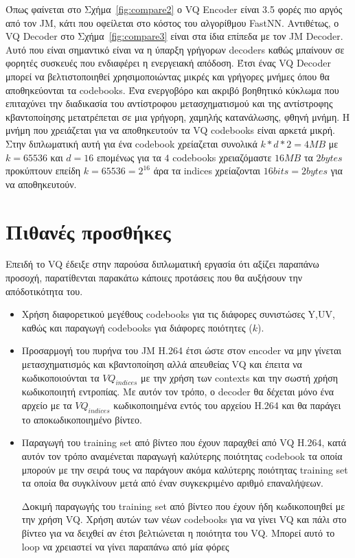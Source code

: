 \indent Όπως φαίνεται στο Σχήμα~\ref{fig:compare2}  ο VQ Encoder είναι 3.5 φορές πιο αργός από τον JM, κάτι που οφείλεται στο κόστος του αλγορίθμου FastNN. Αντιθέτως, ο VQ Decoder στο Σχήμα~\ref{fig:compare3} είναι στα ίδια επίπεδα με τον JM Decoder. Αυτό που είναι σημαντικό είναι να η ύπαρξη γρήγορων decoders καθώς μπαίνουν σε φορητές συσκευές που ενδιαφέρει η ενεργειακή απόδοση. Έτσι ένας VQ Decoder μπορεί να βελτιστοποιηθεί χρησιμοποιώντας μικρές και γρήγορες μνήμες όπου θα αποθηκεύονται τα codebooks. Ένα ενεργοβόρο και ακριβό βοηθητικό κύκλωμα που επιταχύνει την διαδικασία του αντίστροφου μετασχηματισμού και της αντίστροφης κβαντοποίησης μετατρέπεται σε μια γρήγορη, χαμηλής κατανάλωσης, φθηνή μνήμη. Η μνήμη που χρειάζεται για να αποθηκευτούν τα VQ codebooks είναι αρκετά μικρή. Στην διπλωματική αυτή για ένα codebook χρείαζεται συνολικά $k*d*2 = 4MB$ με $k=65536$ και $d=16$ επομένως για τα $4$ codebooks χρειαζόμαστε $16MB$ τα $2 bytes$ προκύπτουν επείδη $k=65536=2^{16}$ άρα τα indices χρείαζονται $16  bits = 2  bytes$ για να αποθηκευτούν.

\section{Πιθανές προσθήκες}
\label{section:sect63}

\indent Επειδή το VQ έδειξε στην παρούσα διπλωματική εργασία ότι αξίζει παραπάνω προσοχή, παρατίθενται παρακάτω κάποιες προτάσεις που θα αυξήσουν την απόδοτικότητα του.

\begin{itemize}

    \item Χρήση διαφορετικού μεγέθους codebooks για τις διάφορες συνιστώσες Y,UV, καθώς και παραγωγή codebooks για διάφορες ποιότητες ($k$).

    \item Προσαρμογή του πυρήνα του JM H.264 έτσι ώστε στον encoder να μην γίνεται μετασχηματισμός και κβαντοποίηση αλλά απευθείας VQ και έπειτα να κωδικοποιούνται τα $VQ_{indices}$ με την χρήση των contexts και την σωστή χρήση κωδικοποιητή εντροπίας. Με αυτόν τον τρόπο, ο decoder θα δέχεται μόνο ένα αρχείο με τα $VQ_{indices}$ κωδικοποιημένα εντός του αρχείου H.264 και θα παράγει το αποκωδικοποιημένο βίντεο.

    \item Παραγωγή του training set από βίντεο που έχουν παραχθεί από VQ H.264, κατά αυτόν τον τρόπο αναμένεται παραγωγή καλύτερης ποιότητας codebook τα οποία μπορούν με την σειρά τους να παράγουν ακόμα καλύτερης ποιότητας training set τα οποία θα συγκλίνουν μετά από έναν συγκεκριμένο αριθμό επαναλήψεων.
    
    Δοκιμή παραγωγής του training set από βίντεο που έχουν ήδη κωδικοποιηθεί με την χρήση VQ. Χρήση αυτών των νέων codebooks για να γίνει VQ και πάλι στο βίντεο για να δειχθεί αν έτσι βελτιώνεται η ποιότητα του VQ. Μπορεί αυτό το loop να χρειαστεί να γίνει παραπάνω από μία φόρες
\end{itemize}